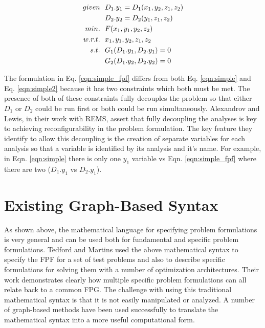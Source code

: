     \begin{align}
        given & \ \ D_1.y_1 = D_1(x_1,y_2,z_1,z_2) \notag
        \\      & \ \ D_2.y_2 = D_2(y_1,z_1,z_2) \notag
        \\min. &\ \ F(x_1,y_1,y_2,z_2) \notag
        \\w.r.t. & \ \ x_1,y_1,y_2,z_1,z_2 \notag
        \\s.t. & \ \ G_1(D_1.y_1,D_2.y_1) = 0 \notag
        \\     & \ \ G_2(D_1.y_2,D_2.y_2) = 0
        \label{eqn:simple_fpf}
    \end{align}

    The formulation in Eq. \ref{eqn:simple_fpf} differs from both Eq. \ref{eqn:simple} 
    and Eq. \ref{eqn:simple2} because it has two constraints which both must be 
    met. The presence of both of these constraints fully decouples the problem so that 
    either $D_1$ or $D_2$ could be run first or both could be run simultaneously. 
    Alexandrov and Lewis, in their work with REMS, assert that fully decoupling 
    the analyses is key to achieving reconfigurability in the problem 
    formulation\cite{alexandrov2004}. The key feature they identify to allow this decoupling 
    is the creation of separate variables for each analysis so that a variable 
    is identified by its analysis and it's name. For example, in Eqn. \ref{eqn:simple}
    there is only one $y_1$ variable vs Eqn. \ref{eqn:simple_fpf} where 
    there are two ($D_1.y_1$ vs $D_2.y_1$). 


\section{Existing Graph-Based Syntax}

    As shown above, the mathematical language for specifying problem formulations is very general and can be used both for 
    fundamental and specific problem formulations. Tedford and Martins used the above mathematical syntax to specify the 
    FPF for a set of test problems and also to describe specific formulations for solving them with a 
    number of optimization architectures\cite{Tedford2009}. Their work demonstrates clearly how multiple specific 
    problem formulations can all relate back to a common FPG. The challenge with using this 
    traditional mathematical syntax is that it is not easily manipulated or analyzed. 
    A number of graph-based methods have been used successfully to translate the 
    mathematical syntax into a more useful computational form. 
    

